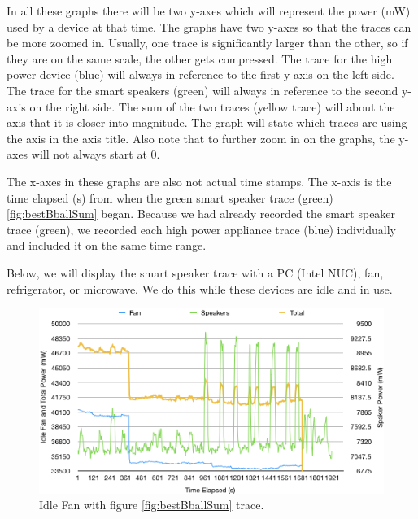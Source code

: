 In all these graphs there will be two y-axes which will represent the power (mW) used by a device at that time. The graphs have two y-axes so that the traces can be more zoomed in. Usually, one trace is significantly larger than the other, so if they are on the same scale, the other gets compressed. The trace for the high power device (blue) will always in reference to the first y-axis on the left side. The trace for the smart speakers (green) will always in reference to the second y-axis on the right side. The sum of the two traces (yellow trace) will about the axis that it is closer into magnitude. The graph will state which traces are using the axis in the axis title. Also note that to further zoom in on the graphs, the y-axes will not always start at 0.

The x-axes in these graphs are also not actual time stamps. The x-axis is the time elapsed (s) from when the green smart speaker trace (green) \ref{fig:bestBballSum} began. Because we had already recorded the smart speaker trace (green), we recorded each high power appliance trace (blue) individually and included it on the same time range.

Below, we will display the smart speaker trace with a PC (Intel NUC), fan, refrigerator, or microwave. We do this while these devices are idle and in use.

\begin{figure}[H]
  \centering
  \includegraphics[width=1\textwidth]{figures/fanIdle.png}
  \caption{Idle Fan with figure \ref{fig:bestBballSum} trace.}
  \label{fig:fanIdle}
\end{figure}

